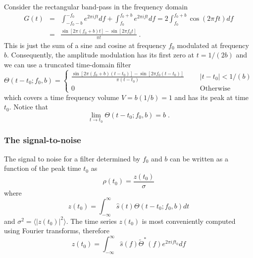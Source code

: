 Consider the rectangular band-pass in the frequency domain
\begin{eqnarray}
G(t) &=& \int_{-f_0 - b}^{-f_0} e^{2 \pi i f t} df  +
\int_{f_0}^{f_0+b}  e^{2 \pi i f t} df 
= 2 \int_{f_0}^{f_0+b} \cos ( 2 \pi f t ) df \\
&=& \frac{\sin[2\pi(f_0+b)t] - \sin[2 \pi f_0 t]}{\pi t} \; .
\end{eqnarray}
This is just the sum of a sine and cosine at
frequency $f_0$ modulated at frequency $b$.
Consequently,  the amplitude modulation has its first zero at
$t = 1/ (2 b)$ and we can use a truncated time-domain filter
\begin{equation}
\Theta(t - t_0; f_0 , b) = \left\{
\begin{array}{lrl}
\displaystyle{
\frac{\sin[2\pi(f_0+b)(t-t_0)] - \sin[2 \pi f_0 (t-t_0)]}{\pi (t-t_0)} 
} & \mbox{\ \ } & |t-t_0| < 1/(b)  \\
0 & & \textrm{Otherwise}
\end{array} \right. 
\end{equation}
which covers a time frequency volume $V = b (1/b) = 1$ and has its
peak at time $t_0$.   Notice that
\begin{equation}
\lim_{t\rightarrow t_0} \Theta(t - t_0; f_0 , b) = b\; .
\end{equation}

\subsubsection{The signal-to-noise}

The signal to noise for a filter determined by $f_0$ and $b$ can be
written as a function of the peak time $t_0$ as
\begin{equation}
\rho(t_0) = \frac{z(t_0)}{\sigma}
\end{equation}
where
\begin{equation}
z(t_0) = \int_{-\infty}^\infty \hat{s}(t) \Theta(t-t_0; f_0, b) 
dt
\end{equation} and $\sigma^2 = \langle |z(t_0)|^2 \rangle$.  The time
series $z(t_0)$ is most conveniently computed using Fourier
transforms,  therefore
\begin{equation}
z(t_0) = \int_{-\infty}^{\infty} \hat{s}(f) \tilde{\Theta}^\ast (f) 
e^{2 \pi i ft_0} df
\end{equation}

